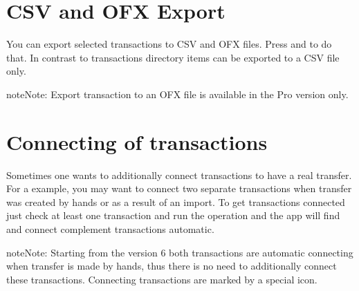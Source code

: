 \documentclass[a4paper,10pt,english]{sphinxmanual}
\begin{document}
\noindent{}

\noindent{}

\noindent{}


\section{CSV and OFX Export}
\label{\detokenize{bulk-actions:csv-and-ofx-export}}
You can export selected transactions to CSV and OFX files. Press 
and  to do that. In contrast to transactions directory items
can be exported to a CSV file only.

\begin{sphinxadmonition}{note}{Note:}
Export transaction to an OFX file is available in the Pro version only.
\end{sphinxadmonition}

\noindent{}

\noindent{}

\noindent{}


\section{Connecting of transactions}
\label{\detokenize{bulk-actions:connecting-of-transactions}}
Sometimes one wants to additionally connect transactions to have a real transfer. For a
example, you may want to connect two separate transactions when transfer was created by hands or
as a result of an import. To get transactions connected just check at least one transaction and
run the operation and the app will find and connect complement transactions automatic.

\noindent{}

\begin{sphinxadmonition}{note}{Note:}
Starting from the version 6 both transactions are automatic connecting when transfer is
made by hands, thus there is no need to additionally connect these transactions. Connecting
transactions are marked by a special icon.
\end{sphinxadmonition}
\end{document}
